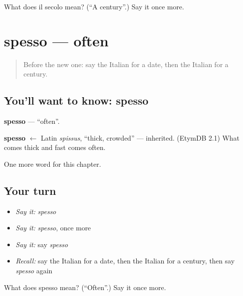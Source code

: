 \begin{tcolorbox}[breakable,colback=teal!4,colframe=teal!35!black,title={Before you move on}]
What does il secolo mean? (\textquotedblleft{}A century\textquotedblright{}.) Say it once more.
\end{tcolorbox}
\section[spesso]{spesso — often}

\label{lesson:IT-C131-spesso}



\begin{quote}
Before the new one: say the Italian for a date, then the Italian for a century.
\end{quote}

\subsection*{You'll want to know: spesso}
\textbf{spesso} — \textquotedblleft{}often\textquotedblright{}.

\begin{cousinweb}
\textbf{spesso} $\leftarrow$ Latin \emph{spissus}, \textquotedblleft{}thick, crowded\textquotedblright{} — inherited. (EtymDB 2.1) What comes thick and fast comes often.
\end{cousinweb}

\begin{grammarlens}[title={What you've built}]
One more word for this chapter.
\end{grammarlens}

\subsection*{Your turn}
\begin{itemize}
\raggedright
  \item \emph{Say it:} \emph{spesso}
  \item \emph{Say it:} \emph{spesso}, once more
  \item \emph{Say it:} say \emph{spesso}
  \item \emph{Recall:} say the Italian for a date, then the Italian for a century, then say \emph{spesso} again
\end{itemize}

\begin{tcolorbox}[breakable,colback=teal!4,colframe=teal!35!black,title={Before you move on}]
What does spesso mean? (\textquotedblleft{}Often\textquotedblright{}.) Say it once more.
\end{tcolorbox}
